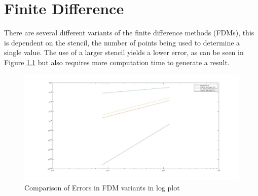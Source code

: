 \chapter{Finite Difference}
There are several different variants of the  finite difference methods (FDMs), this is dependent on the stencil, the number of points being used to determine a single value. The use of a larger stencil yields a lower error, as can be seen in Figure \ref{fig:errorgraph} but also requires more computation time to generate a result.
\begin{figure}[H] 
 \includegraphics[width=\textwidth]{Images/Error.jpg}
 \caption{Comparison of Errors in FDM variants in log plot}
 \label{fig:errorgraph}
\end{figure}
